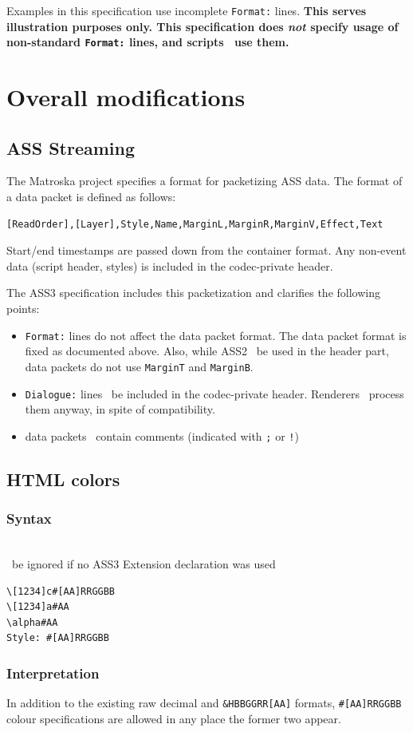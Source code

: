 \documentclass{spec}
\newcommand{\syntax}[1]{
	\subsubsection*{Syntax}
	\begin{tabbing}
	\hspace{2cm}\=\\[-16pt]
	#1
	\end{tabbing}
}
\gdef\compat{}
\newcommand{\mustuse}[1]{\must\ be ignored if no ASS3 Extension declaration was used%
\gappto{\compat}{\hspace{9pt} #1 & \textbf{required}\\[3pt]}}
\begin{document}
Examples in this specification use incomplete \texttt{Format:} lines.
\textbf{This serves illustration purposes only. This specification does \emph{not}
specify usage of non-standard \texttt{Format:} lines, and scripts \mustnot\ use them.}

\section{Overall modifications}
\subsection{ASS Streaming}
The Matroska project\cite{mkv} specifies a format for packetizing ASS data.
The format of a data packet is defined as follows:

\begin{verbatim}
[ReadOrder],[Layer],Style,Name,MarginL,MarginR,MarginV,Effect,Text
\end{verbatim}

Start/end timestamps are passed down from the container format. Any non-event
data (script header, styles) is included in the codec-private header.

The ASS3 specification includes this packetization and clarifies the following
points:
\begin{itemize}
\item \texttt{Format:} lines do not affect the data packet format.
The data packet format is fixed as documented above. Also, while ASS2 \may\ 
be used in the header part, data packets do not use \texttt{MarginT} and
\texttt{MarginB}.
\item \texttt{Dialogue:} lines \mustnot\ be included in the codec-private
header. Renderers \should\ process them anyway, in spite of compatibility.
\item data packets \mustnot\ contain comments (indicated with \verb!;! or
\verb;!;)
\end{itemize}

\subsection{HTML colors}
\syntax{\mustuse{HTML colors}}

\begin{verbatim}
\[1234]c#[AA]RRGGBB
\[1234]a#AA
\alpha#AA
Style: #[AA]RRGGBB
\end{verbatim}

\subsubsection*{Interpretation}
In addition to the existing raw decimal and \verb!&HBBGGRR[AA]! formats,
\verb!#[AA]RRGGBB! colour specifications are allowed in any
place the former two appear.
\end{document}
